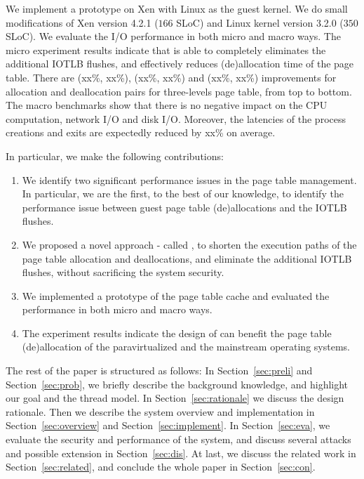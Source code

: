 We implement a prototype on Xen with Linux as the guest kernel. We do small modifications of Xen version 4.2.1 ($166$ SLoC) and Linux kernel version 3.2.0 ($350$ SLoC).
We evaluate the I/O performance in both micro and macro ways.
The micro experiment results indicate that \name is able to completely eliminates the additional IOTLB flushes, and effectively reduces (de)allocation time of the page table. 
There are (xx\%, xx\%), (xx\%, xx\%) and (xx\%, xx\%) improvements for allocation and deallocation pairs for three-levels page table, from top to bottom.
The macro benchmarks show that there is no negative impact on the CPU computation, network I/O and disk I/O. 
Moreover, the latencies of the process creations and exits are expectedly reduced by xx\% on average. 

In particular, we make the following contributions:
\begin{enumerate}
\item We identify two significant performance issues in the page table management. In particular, we are the first, to the best of our knowledge, to identify the performance issue between guest page table (de)allocations and the IOTLB flushes.
\item We proposed a novel approach - called \name, to shorten the execution paths of the page table allocation and deallocations, and eliminate the additional IOTLB flushes, without sacrificing the system security.
\item We implemented a prototype of the page table cache and evaluated the performance in both micro and macro ways.
\item The experiment results indicate the design of \name can benefit the page table (de)allocation of the paravirtualized and the mainstream operating systems.
\end{enumerate}

The rest of the paper is structured as follows: In Section~\ref{sec:preli} and Section~\ref{sec:prob}, we briefly describe the background knowledge, and highlight our goal and the thread model. In Section~\ref{sec:rationale} we discuss the design rationale. Then we describe the system overview and implementation in Section~\ref{sec:overview} and Section~\ref{sec:implement}. In Section~\ref{sec:eva}, we evaluate the security and performance of the system, and discuss several attacks and possible extension in Section~\ref{sec:dis}. At last, we discuss the related work in Section~\ref{sec:related}, and conclude the whole paper in Section~\ref{sec:con}.

